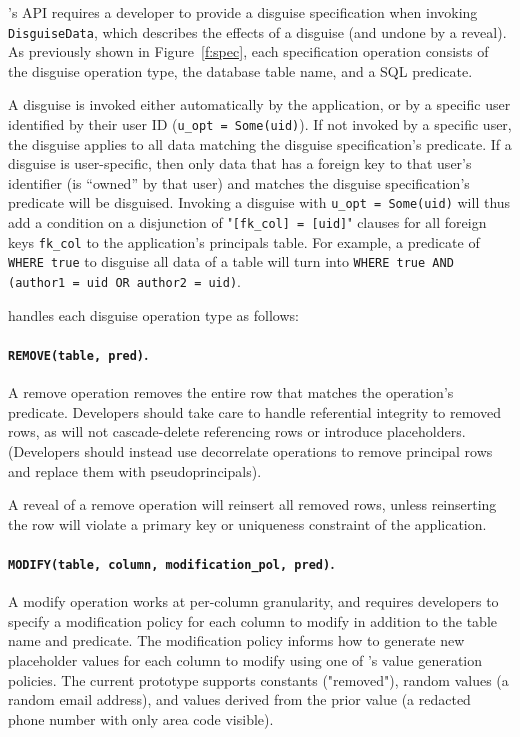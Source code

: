 \sys's API requires a developer to provide a disguise specification when
invoking \texttt{DisguiseData}, which describes the effects of a disguise (and
undone by a reveal).  As previously shown in Figure~\ref{f:spec}, each
specification operation consists of the disguise operation type, the database
table name, and a SQL  predicate.
%

%
A disguise is invoked either automatically by the application, or by a specific
user identified by their user ID (\texttt{u\_opt =
Some(uid)}).
% 
If not invoked by a specific user, the disguise applies to all data matching the
disguise specification's predicate.
%
If a disguise is user-specific, then only data that has a foreign key to that
user's identifier (is ``owned'' by that user) and matches the disguise
specification's predicate will be disguised. Invoking a disguise with
\texttt{u\_opt = Some(uid)} will thus add a condition on a disjunction of
"\texttt{[fk\_col] = [uid]}" clauses for all foreign keys \texttt{fk\_col} to
the application's principals table. For example, a predicate of \texttt{WHERE
true} to disguise all data of a table will turn into \texttt{WHERE true AND
(author1 = uid OR author2 = uid)}.

\sys handles each disguise operation type as follows:
%

\paragraph{\texttt{REMOVE(table, pred)}.}
A remove operation removes the entire row that matches the operation's
predicate.
%
Developers should take care to handle referential integrity to removed rows, as
\sys will not cascade-delete referencing rows or introduce placeholders.
(Developers should instead use decorrelate operations to remove principal rows
and replace them with pseudoprincipals).
%

%
A reveal of a remove operation will reinsert all removed rows, unless
reinserting the row will violate a primary key or uniqueness constraint of the
application.
%

%
\paragraph{\texttt{MODIFY(table, column, modification\_pol, pred)}.}
A modify operation works at per-col\-umn granularity, and requires developers to
specify a modification policy for each column to modify in addition to the table
name and predicate.
%
The modification policy informs \sys how to generate new placeholder values for
each column to modify using one of \sys's value generation policies. The current
prototype supports constants (\eg "removed"), random values (\eg a random email
address), and values derived from the prior value (\eg a redacted phone number
with only area code visible).
%

